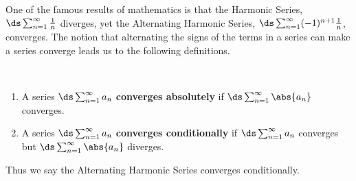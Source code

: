 One of the famous results of mathematics is that the Harmonic Series,\vspace{-.5\baselineskip} $\ds \sum_{n=1}^\infty \frac1n$ diverges, yet the Alternating Harmonic Series, $\ds \sum_{n=1}^\infty (-1)^{n+1}\frac1n$, converges. The notion that alternating the signs of the terms in a series can make a series converge leads us to the following definitions.

\begin{definition}\label{def:abs_converge}
%
\mbox{}\\[-2\baselineskip]\parbox[t]{\linewidth}{%
\begin{enumerate}
	\item A series $\ds \sum_{n=1}^\infty a_n$ \textbf{converges absolutely} if $\ds \sum_{n=1}^\infty \abs{a_n}$ converges.
	\item A series $\ds \sum_{n=1}^\infty a_n$ \textbf{converges conditionally} if $\ds \sum_{n=1}^\infty a_n$ converges but $\ds \sum_{n=1}^\infty \abs{a_n}$ diverges.
\end{enumerate}}
\end{definition}


Thus we say the Alternating Harmonic Series converges conditionally.

